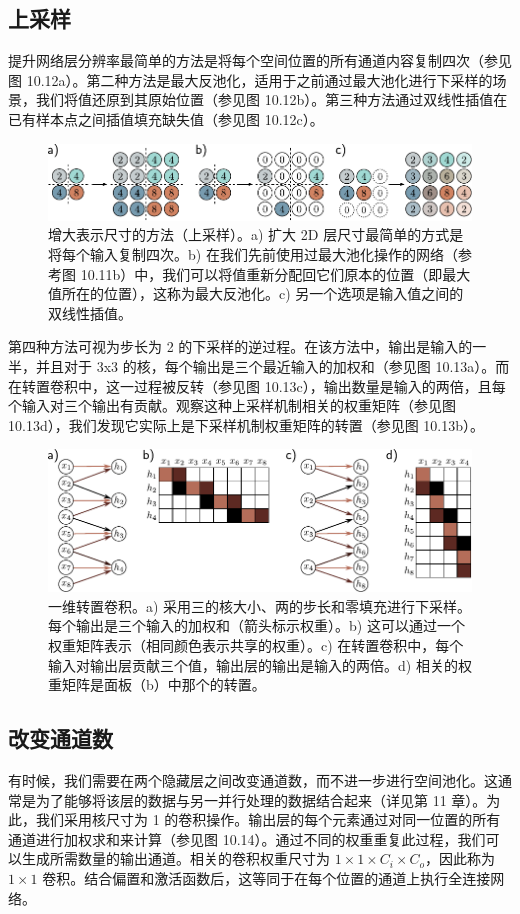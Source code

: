\documentclass[lang=cn,newtx,10pt,scheme=chinese]{elegantbook}
\begin{document}
\subsection{上采样}
提升网络层分辨率最简单的方法是将每个空间位置的所有通道内容复制四次（参见图 10.12a）。第二种方法是最大反池化，适用于之前通过最大池化进行下采样的场景，我们将值还原到其原始位置（参见图 10.12b）。第三种方法通过双线性插值在已有样本点之间插值填充缺失值（参见图 10.12c）。


\begin{figure}[ht!]
	\centering
	\includegraphics[width=0.7\linewidth]{PDFFigures/UDLChap10PDF/ConvUp.pdf}
	\caption{增大表示尺寸的方法（上采样）。a) 扩大 2D 层尺寸最简单的方式是将每个输入复制四次。b) 在我们先前使用过最大池化操作的网络（参考图 10.11b）中，我们可以将值重新分配回它们原本的位置（即最大值所在的位置），这称为最大反池化。c) 另一个选项是输入值之间的双线性插值。}
\end{figure}


第四种方法可视为步长为 2 的下采样的逆过程。在该方法中，输出是输入的一半，并且对于 3x3 的核，每个输出是三个最近输入的加权和（参见图 10.13a）。而在转置卷积中，这一过程被反转（参见图 10.13c），输出数量是输入的两倍，且每个输入对三个输出有贡献。观察这种上采样机制相关的权重矩阵（参见图 10.13d），我们发现它实际上是下采样机制权重矩阵的转置（参见图 10.13b）。


\begin{figure}[ht!]
	\centering
	\includegraphics[width=0.7\linewidth]{PDFFigures/UDLChap10PDF/ConvTranspose.pdf}
	\caption{一维转置卷积。a) 采用三的核大小、两的步长和零填充进行下采样。每个输出是三个输入的加权和（箭头标示权重）。b) 这可以通过一个权重矩阵表示（相同颜色表示共享的权重）。c) 在转置卷积中，每个输入对输出层贡献三个值，输出层的输出是输入的两倍。d) 相关的权重矩阵是面板（b）中那个的转置。}
\end{figure}


\subsection{改变通道数}
有时候，我们需要在两个隐藏层之间改变通道数，而不进一步进行空间池化。这通常是为了能够将该层的数据与另一并行处理的数据结合起来（详见第 11 章）。为此，我们采用核尺寸为 1 的卷积操作。输出层的每个元素通过对同一位置的所有通道进行加权求和来计算（参见图 10.14）。通过不同的权重重复此过程，我们可以生成所需数量的输出通道。相关的卷积权重尺寸为 \(1 \times 1 \times C_i \times C_o\)，因此称为 \(1 \times 1\) 卷积。结合偏置和激活函数后，这等同于在每个位置的通道上执行全连接网络。
\end{document}
